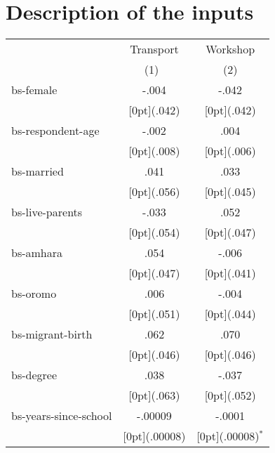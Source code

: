 \documentclass{article}
\begin{document}
\maketitle

\section{Description of the inputs}

\begin{tabular*}{\textwidth}{@{\extracolsep{\fill}}lcc}		
	& \multicolumn{1}{c}{Transport} &	\multicolumn{1}{c}{Workshop} \\
\cline{2-3}		
	& \multicolumn{1}{c}{(1)\mbox{\ }} &	\multicolumn{1}{c}{(2)} \\
\hline		
bs-female &	-.004 &	-.042 \\
&	\raisebox{.7ex}[0pt]{\scriptsize (.042)} &	\raisebox{.7ex}[0pt]{\scriptsize (.042)} \\
bs-respondent-age &	-.002 &	.004 \\
&	\raisebox{.7ex}[0pt]{\scriptsize (.008)} &	\raisebox{.7ex}[0pt]{\scriptsize (.006)} \\
bs-married &	.041 &	.033 \\
&	\raisebox{.7ex}[0pt]{\scriptsize (.056)} &	\raisebox{.7ex}[0pt]{\scriptsize (.045)} \\
bs-live-parents &	-.033 &	.052 \\
&	\raisebox{.7ex}[0pt]{\scriptsize (.054)} &	\raisebox{.7ex}[0pt]{\scriptsize (.047)} \\
bs-amhara &	.054 &	-.006 \\
&	\raisebox{.7ex}[0pt]{\scriptsize (.047)} &	\raisebox{.7ex}[0pt]{\scriptsize (.041)} \\
bs-oromo &	.006 &	-.004 \\
&	\raisebox{.7ex}[0pt]{\scriptsize (.051)} &	\raisebox{.7ex}[0pt]{\scriptsize (.044)} \\
bs-migrant-birth &	.062 &	.070 \\
&	\raisebox{.7ex}[0pt]{\scriptsize (.046)} &	\raisebox{.7ex}[0pt]{\scriptsize (.046)} \\
bs-degree &	.038 &	-.037 \\
&	\raisebox{.7ex}[0pt]{\scriptsize (.063)} &	\raisebox{.7ex}[0pt]{\scriptsize (.052)} \\
bs-years-since-school &	-.00009 &	-.0001 \\
&	\raisebox{.7ex}[0pt]{\scriptsize (.00008)} &	\raisebox{.7ex}[0pt]{\scriptsize (.00008)$^{*}$} \\

\end{tabular*}
\end{document}
